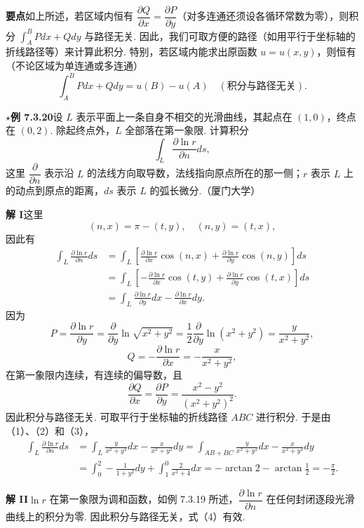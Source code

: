 \documentclass[UTF8,12pt,a4paper,fontset=fandol]{ctexart}
\begin{document}
\noindent\textbf{要点}\quad 如上所述，若区域内恒有 $\dfrac{\partial Q}{\partial x}=\dfrac{\partial P}{\partial y}$（对多连通还须设各循环常数为零），则积分 $\displaystyle\int_A^BPdx+Qdy$ 与路径无关. 因此，我们可取方便的路径（如用平行于坐标轴的折线路径等）来计算此积分. 特别，若区域内能求出原函数 $u=u(x,y)$，则恒有（不论区域为单连通或多连通）
\[
\int_A^BPdx+Qdy=u(B)-u(A)\quad(\text{积分与路径无关}).
\]

\noindent\textbf{$\star$例 7.3.20}\quad 设 $L$ 表示平面上一条自身不相交的光滑曲线，其起点在 $(1,0)$，终点在 $(0,2)$. 除起终点外，$L$ 全部落在第一象限. 计算积分
\[
\int_L\frac{\partial\ln r}{\partial n}ds,
\]
这里 $\dfrac{\partial}{\partial n}$ 表示沿 $L$ 的法线方向取导数，法线指向原点所在的那一侧；$r$ 表示 $L$ 上的动点到原点的距离，$ds$ 表示 $L$ 的弧长微分.（厦门大学）

\noindent\textbf{解 I}\quad 这里
\[
(n,x)=\pi-(t,y),\quad (n,y)=(t,x),
\]
因此有
\begin{equation}
\begin{aligned}
\int_L\frac{\partial\ln r}{\partial n}ds
&=\int_L\left[\frac{\partial\ln r}{\partial x}\cos(n,x)
+\frac{\partial\ln r}{\partial y}\cos(n,y)\right]ds\\
&=\int_L\left[-\frac{\partial\ln r}{\partial x}\cos(t,y)
+\frac{\partial\ln r}{\partial y}\cos(t,x)\right]ds\\
&=\int_L\frac{\partial\ln r}{\partial y}dx
-\frac{\partial\ln r}{\partial x}dy.
\end{aligned}
\tag{1}
\end{equation}
因为
\[
P=\frac{\partial\ln r}{\partial y}
=\frac{\partial}{\partial y}\ln\sqrt{x^2+y^2}
=\frac12\frac{\partial}{\partial y}\ln(x^2+y^2)
=\frac y{x^2+y^2}, \tag{2}
\]
\[
Q=-\frac{\partial\ln r}{\partial x}
=-\frac x{x^2+y^2}, \tag{3}
\]
在第一象限内连续，有连续的偏导数，且
\[
\frac{\partial Q}{\partial x}=\frac{\partial P}{\partial y}
=\frac{x^2-y^2}{(x^2+y^2)^2}.
\]
因此积分与路径无关. 可取平行于坐标轴的折线路径 $ABC$ 进行积分. 于是由（1）、（2）和（3），
\begin{equation}
\begin{aligned}
\int_L\frac{\partial\ln r}{\partial n}ds
&=\int_L\frac y{x^2+y^2}dx-\frac x{x^2+y^2}dy
=\int_{AB+BC}\frac y{x^2+y^2}dx-\frac x{x^2+y^2}dy\\
&=\int_0^2-\frac1{1+y^2}dy+\int_1^0\frac2{x^2+4}dx
=-\arctan2-\arctan\frac12=-\frac\pi2.
\end{aligned}
\tag{4}
\end{equation}

\noindent\textbf{解 II}\quad $\ln r$ 在第一象限为调和函数，如例 7.3.19 所述，$\dfrac{\partial\ln r}{\partial n}$ 在任何封闭逐段光滑曲线上的积分为零. 因此积分与路径无关，式（4）有效.
\end{document}
